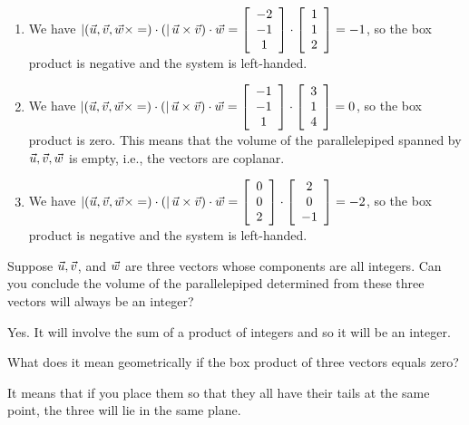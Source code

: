 \documentclass{ximera}
\begin{document}
\begin{example}
\begin{solution}
\begin{enumerate}
      \item We have
        $\boxprod{\vect{u},\vect{v},\vect{w}} = (\vect{u}\times\vect{v})
        \cdot \vect{w} = \startmat{c}-2\\-1\\1\stopmat\cdot\startmat{c}1\\1\\2\stopmat=-1$, so
        the box product is negative and the system is left-handed.
      \item We have
        $\boxprod{\vect{u},\vect{v},\vect{w}} = (\vect{u}\times\vect{v})
        \cdot \vect{w} = \startmat{c}-1\\-1\\1\stopmat\cdot\startmat{c}3\\1\\4\stopmat=0$, so
        the box product is zero. This means that the volume of the
        parallelepiped spanned by $\vect{u},\vect{v},\vect{w}$ is empty,
        i.e., the vectors are coplanar.
      \item We have
        $\boxprod{\vect{u},\vect{v},\vect{w}} = (\vect{u}\times\vect{v})
        \cdot \vect{w} = \startmat{c}0\\0\\2\stopmat\cdot\startmat{c}2\\0\\-1\stopmat=-2$, so
        the box product is negative and the system is left-handed.
      \end{enumerate}
    \end{solution}
  \end{example}
  
  \begin{example}
    Suppose $\vect{u},\vect{v}$, and $\vect{w}$ are three vectors whose
    components are all integers. Can you conclude the volume of the
    parallelepiped determined from these three vectors will always be an
    integer?
    \begin{solution}
      Yes. It will involve the sum of a product of integers and so it will
      be an integer.
    \end{solution}
  \end{example}
  
  \begin{example} \label{exer-box-product-zero}
    What does it mean geometrically if the box product of three vectors
    equals zero?
    \begin{solution}
      It means that if you place them so that they all have their tails
      at the same point, the three will lie in the same plane.
    \end{solution}
  \end{example}
  
\end{document}
